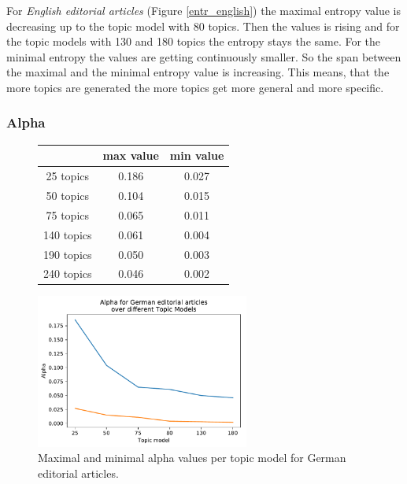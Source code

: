 For \textit{English editorial articles} (Figure \ref{entr_english}) the maximal entropy value is decreasing up to the topic model with 80 topics. Then the values is rising and for the topic models with 130 and 180 topics the entropy stays the same. For the minimal entropy the values are getting continuously smaller. So the span between the maximal and the minimal entropy value is increasing. This means, that the more topics are generated the more topics get more general and more specific. 


\subsubsection{Alpha}
\begin{figure}
	\begin{minipage}{0.5\textwidth}
		\centering
			\begin{tabular}[t]{c|cc}
				&max value & min value\\
				\hline
				25 topics&0.186&0.027\\
				50 topics&0.104&0.015\\
				75 topics&0.065&0.011\\
				140 topics&	0.061&0.004\\
				190 topics &0.050&0.003\\
				240 topics&	0.046&0.002\\
			\end{tabular}
	\end{minipage}%
	\begin{minipage}{0.5\textwidth}
		\centering
		\includegraphics[width=7cm]{gfx/Eval_IC/German_Editorial_Alpha.pdf}
	\end{minipage}
	\caption{Maximal and minimal alpha values per topic model for German editorial articles.}
	\label{alpha_ger}
\end{figure}
